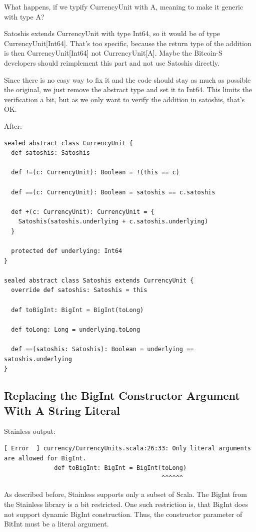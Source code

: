 \documentclass[runningheads]{llncs}
\begin{document}
What happens, if we typify CurrencyUnit with A, meaning to make it generic with type A?

Satoshis extends CurrencyUnit with type Int64, so it would be of type CurrencyUnit[Int64].
That's too specific, because the return type of the addition is then CurrencyUnit[Int64] not CurrencyUnit[A].
Maybe the Bitcoin-S developers should reimplement this part and not use Satoshis directly.

Since there is no easy way to fix it and the code should stay as much as possible the original, we just remove the abstract type and set it to Int64.
This limits the verification a bit, but as we only want to verify the addition in satoshis, that's OK.

After:
\begin{lstlisting}[style=scala]
sealed abstract class CurrencyUnit {
  def satoshis: Satoshis

  def !=(c: CurrencyUnit): Boolean = !(this == c)

  def ==(c: CurrencyUnit): Boolean = satoshis == c.satoshis

  def +(c: CurrencyUnit): CurrencyUnit = {
    Satoshis(satoshis.underlying + c.satoshis.underlying)
  }

  protected def underlying: Int64
}

sealed abstract class Satoshis extends CurrencyUnit {
  override def satoshis: Satoshis = this

  def toBigInt: BigInt = BigInt(toLong)

  def toLong: Long = underlying.toLong

  def ==(satoshis: Satoshis): Boolean = underlying == satoshis.underlying
}
\end{lstlisting}


\subsection{Replacing the BigInt Constructor Argument With A String Literal}

Stainless output:
\begin{lstlisting}[style=stainless]
  [ Error  ] currency/CurrencyUnits.scala:26:33: Only literal arguments are allowed for BigInt.
              def toBigInt: BigInt = BigInt(toLong)
                                            ^^^^^^
\end{lstlisting}

As described before, Stainless supports only a subset of Scala.
The BigInt from the Stainless library is a bit restricted.
One such restriction is, that BigInt does not support dynamic BigInt construction.
Thus, the constructor parameter of BitInt must be a literal argument.
\end{document}
